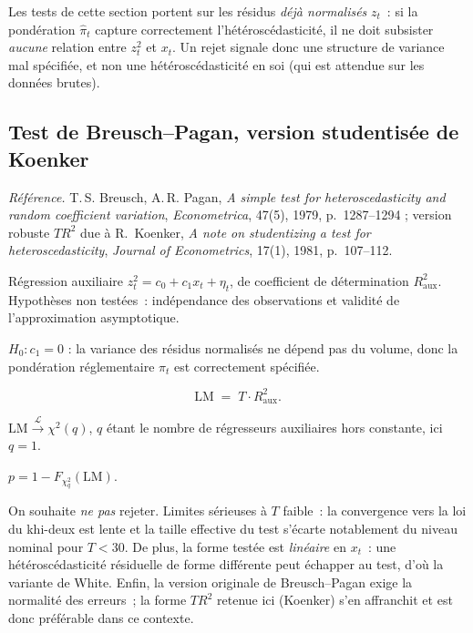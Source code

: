 \documentclass[a4paper,11pt]{article}
\newcommand{\refl}[1]{{\small\textcolor{maincolor!70!black}{\textit{Référence.} #1}}\par\smallskip}
\newcounter{ficheid}
\newenvironment{fiche}[1]{%
  \stepcounter{ficheid}%
  \phantomsection
  \subsection{#1}%
  \label{fiche:\theficheid}%
}{%
  \end{description}\vspace{0.5em}%
}
\newcommand{\Cadre}{%
  \begin{description}[leftmargin=0pt, style=unboxed, itemsep=3pt, topsep=3pt, parsep=2pt]%
  \item[\textcolor{financeblue}{\textbf{1. Cadre, notations et hypothèses de validité (non testées).}}]}
\newcommand{\Hzero}{\item[\textcolor{financeblue}{\textbf{2. Hypothèse nulle.}}]}
\newcommand{\Stat}{\item[\textcolor{financeblue}{\textbf{3. Statistique de test.}}]}
\newcommand{\Loi}{\item[\textcolor{financeblue}{\textbf{4. Loi sous $H_0$.}}]}
\newcommand{\Pval}{\item[\textcolor{financeblue}{\textbf{5. p-value.}}]}
\newcommand{\Usage}{\item[\textcolor{financeblue}{\textbf{6. Usage et limites.}}]}
\begin{document}
Les tests de cette section portent sur les résidus \emph{déjà normalisés} $z_t$~: si la
pondération $\hat\pi_t$ capture correctement l'hétéroscédasticité, il ne doit subsister
\emph{aucune} relation entre $z_t^2$ et $x_t$. Un rejet signale donc une structure de variance
mal spécifiée, et non une hétéroscédasticité en soi (qui est attendue sur les données brutes).

\begin{fiche}{Test de Breusch--Pagan, version studentisée de Koenker}
\refl{T.\,S. Breusch, A.\,R. Pagan, \emph{A simple test for heteroscedasticity and random
coefficient variation}, \emph{Econometrica}, 47(5), 1979, p.~1287--1294 ; version robuste
$T R^2$ due à R.~Koenker, \emph{A note on studentizing a test for heteroscedasticity},
\emph{Journal of Econometrics}, 17(1), 1981, p.~107--112.}
\Cadre
Régression auxiliaire $z_t^2 = c_0 + c_1 x_t + \eta_t$, de coefficient de détermination
$R^2_{\text{aux}}$. Hypothèses non testées~: indépendance des observations et validité de
l'approximation asymptotique.
\Hzero
$H_0 : c_1 = 0$ : la variance des résidus normalisés ne dépend pas du volume, donc la pondération
réglementaire $\pi_t$ est correctement spécifiée.
\Stat
\[
  \mathrm{LM} \;=\; T \cdot R^2_{\text{aux}} .
\]
\Loi
$\mathrm{LM} \xrightarrow{\ \mathcal{L}\ } \chi^2(q)$, $q$ étant le nombre de régresseurs
auxiliaires hors constante, ici $q = 1$.
\Pval
$p = 1 - F_{\chi^2_q}(\mathrm{LM})$.
\Usage
On souhaite \emph{ne pas} rejeter. Limites sérieuses à $T$ faible~: la convergence vers la loi du
khi-deux est lente et la taille effective du test s'écarte notablement du niveau nominal pour
$T < 30$. De plus, la forme testée est \emph{linéaire} en $x_t$~: une hétéroscédasticité
résiduelle de forme différente peut échapper au test, d'où la variante de White. Enfin, la
version originale de Breusch--Pagan exige la normalité des erreurs~; la forme $T R^2$ retenue ici
(Koenker) s'en affranchit et est donc préférable dans ce contexte.
\end{fiche}
\end{document}
